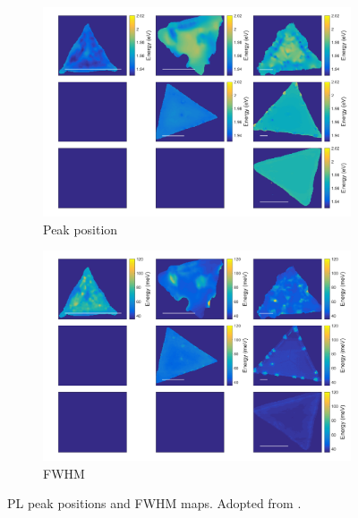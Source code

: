 \begin{figure}[H]
	\begin{center}
		\begin{subfigure}[b]{0.4\textwidth}
			\includegraphics[width=\textwidth]{PaperSIMapsPositionPL.png}
			\caption{Peak position}
			\label{fig:PaperSIMapsPositionPL}
		\end{subfigure}
		\quad
		\begin{subfigure}[b]{0.4\textwidth}
			\includegraphics[width=\textwidth]{PaperSIMapsWidthPL.png}
			\caption{FWHM}
			\label{fig:PaperSIMapsWidthPL}
		\end{subfigure}
		\caption{PL peak positions and FWHM maps. Adopted from \cite{Reale2017}.}
		\label{fig:PaperSIMapsPL}
	\end{center}
\end{figure}

